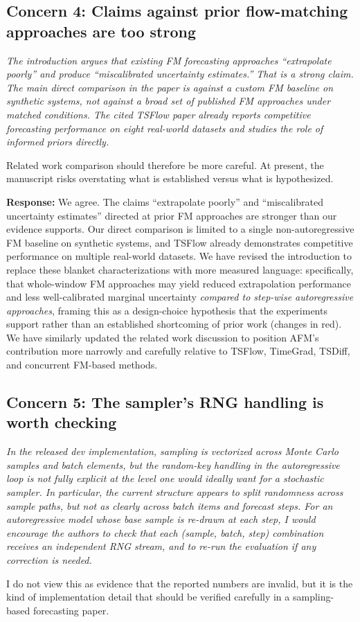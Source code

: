 \documentclass[11pt]{article}
\newcommand{\reviewertext}[1]{%
  \begin{reviewerquote}
    {\color{reviewercolor}\itshape #1}
  \end{reviewerquote}%
}
\newcommand{\authorresponse}[1]{%
  \textbf{Response:} #1\par\medskip
}
\begin{document}
\subsection{Concern 4: Claims against prior flow-matching approaches are too strong}

\reviewertext{%
The introduction argues that existing FM forecasting approaches ``extrapolate poorly'' and produce ``miscalibrated uncertainty estimates.'' That is a strong claim. The main direct comparison in the paper is against a custom FM baseline on synthetic systems, not against a broad set of published FM approaches under matched conditions. The cited TSFlow paper already reports competitive forecasting performance on eight real-world datasets and studies the role of informed priors directly.

Related work comparison should therefore be more careful. At present, the manuscript risks overstating what is established versus what is hypothesized.
}

\authorresponse{%
We agree. The claims ``extrapolate poorly'' and ``miscalibrated uncertainty estimates'' directed at prior FM approaches are stronger than our evidence supports. Our direct comparison is limited to a single non-autoregressive FM baseline on synthetic systems, and TSFlow already demonstrates competitive performance on multiple real-world datasets.
We have revised the introduction to replace these blanket characterizations with more measured language: specifically, that whole-window FM approaches may yield reduced extrapolation performance and less well-calibrated marginal uncertainty \emph{compared to step-wise autoregressive approaches}, framing this as a design-choice hypothesis that the experiments support rather than an established shortcoming of prior work (changes in red). We have similarly updated the related work discussion to position AFM's contribution more narrowly and carefully relative to TSFlow, TimeGrad, TSDiff, and concurrent FM-based methods.}

\subsection{Concern 5: The sampler's RNG handling is worth checking}

\reviewertext{%
In the released dev implementation, sampling is vectorized across Monte Carlo samples and batch elements, but the random-key handling in the autoregressive loop is not fully explicit at the level one would ideally want for a stochastic sampler. In particular, the current structure appears to split randomness across sample paths, but not as clearly across batch items and forecast steps. For an autoregressive model whose base sample is re-drawn at each step, I would encourage the authors to check that each (sample, batch, step) combination receives an independent RNG stream, and to re-run the evaluation if any correction is needed.

I do not view this as evidence that the reported numbers are invalid, but it is the kind of implementation detail that should be verified carefully in a sampling-based forecasting paper.
}
\end{document}
